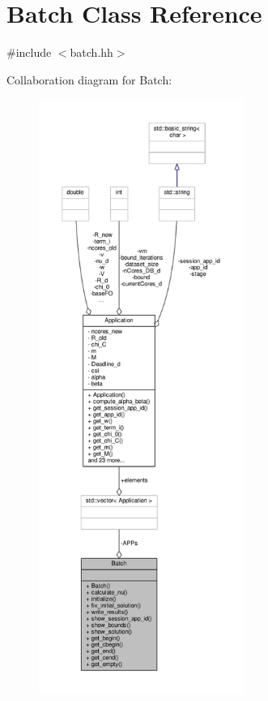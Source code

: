 \hypertarget{classBatch}{\section{Batch Class Reference}
\label{classBatch}
}


{\ttfamily \#include $<$batch.\-hh$>$}



Collaboration diagram for Batch\-:
\nopagebreak
\begin{figure}[H]
\begin{center}
\leavevmode
\includegraphics[height=550pt]{classBatch__coll__graph}
\end{center}
\end{figure}
